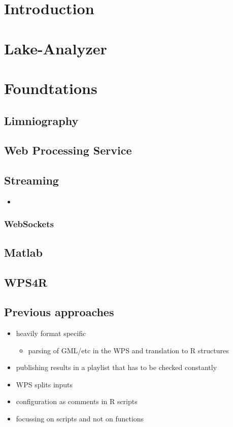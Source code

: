 \section{Introduction}
\section{Lake-Analyzer}
\section{Foundtations}
	\subsection{Limniography}
	\subsection{Web Processing Service}
	\subsection{Streaming}
		\begin{itemize}
			\item
		\end{itemize}
		\subsubsection{WebSockets}
	\subsection{Matlab}
	\subsection{WPS4R}
	\subsection{Previous approaches}
	\begin{itemize}
		\item heavily format specific
		\begin{itemize}
			\item parsing of GML/etc in the WPS and translation to R structures
		\end{itemize}
		\item publishing results in a playlist that has to be checked constantly
		\item WPS splits inputs
		\item configuration as comments in R scripts
		\item focussing on scripts and not on functions
	\end{itemize}
